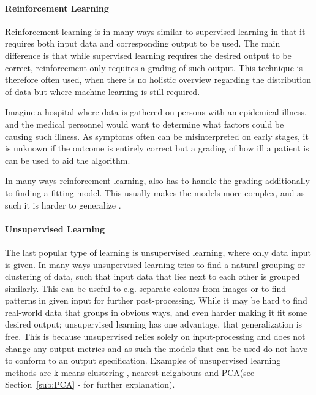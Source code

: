 \paragraph{Reinforcement Learning}
\label{par:ReinforcementLearning}
Reinforcement learning is in many ways similar to supervised learning in that it requires both input data and corresponding output to be used.
The main difference is that while supervised learning requires the desired output to be correct, reinforcement only requires a grading of such output.
This technique is therefore often used, when there is no holistic overview regarding the distribution of data but where machine learning is still required.
\begin{exm}
Imagine a hospital where data is gathered on persons with an epidemical illness, and the
medical personnel would want to determine what factors could be causing such illness. As symptoms often can be misinterpreted on early stages,
it is unknown if the outcome is entirely correct but a grading of how ill a patient is can be used to aid the algorithm.
\end{exm}
In many ways reinforcement learning, also has to handle the grading additionally to finding a fitting model. 
This usually makes the models more complex, and as such it is harder to generalize \cite{sutton96generalizationin}\cite{boyan95generalizationin}.

\paragraph{Unsupervised Learning}
\label{par:UnsupervisedLearning}
The last popular type of learning is unsupervised learning, where only data input is given.
In many ways unsupervised learning tries to find a natural grouping or clustering of data,
such that input data that lies next to each other is grouped similarly.
This can be useful to e.g. separate colours from images or to find patterns in given input for further post-processing.
While it may be hard to find real-world data that groups in obvious ways, and even harder making it fit some desired output;
unsupervised learning has one advantage, that generalization is free. This is because unsupervised relies solely on input-processing and does not change
any output metrics and as such the models that can be used do not have to conform to an output specification.
Examples of unsupervised learning methods are k-means clustering \cite{learningfromdata2012book}, nearest neighbours\cite{scikitlearn2012nearestneighbours} and PCA\cite{smith2002tutorial}(see Section~\ref{sub:PCA} -  for further explanation).

